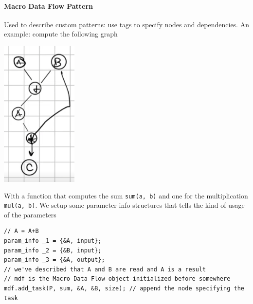 \documentclass[10pt]{report}
\begin{document}
\paragraph{Macro Data Flow Pattern} Used to describe custom patterns: use tags to specify nodes and dependencies. An example: compute the following graph
\begin{center}
	\includegraphics[scale=0.5]{21.png}
\end{center}
With a function that computes the sum \texttt{sum(a, b)} and one for the multiplication \texttt{mul(a, b)}. We setup some parameter info structures that tells the kind of usage of the parameters
\begin{lstlisting}[style=myC]
// A = A+B
param_info _1 = {&A, input};
param_info _2 = {&B, input};
param_info _3 = {&A, output};
// we've described that A and B are read and A is a result
// mdf is the Macro Data Flow object initialized before somewhere
mdf.add_task(P, sum, &A, &B, size); // append the node specifying the task
\end{lstlisting}
\end{document}
